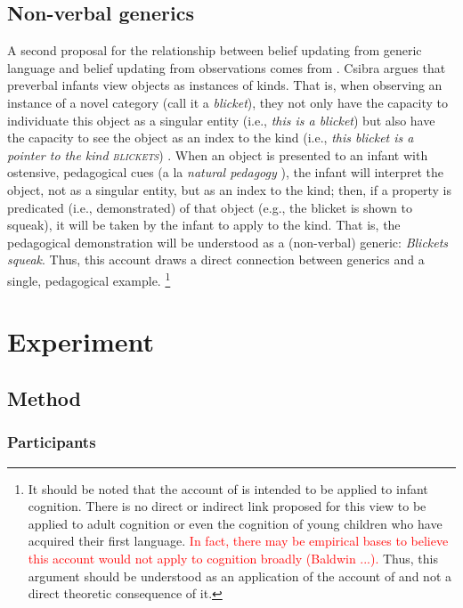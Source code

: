 \documentclass[10pt,letterpaper]{article}
\newcommand{\red}[1]{\textcolor{Red}{#1}}
\begin{document}
\subsection{Non-verbal generics}

A second proposal for the relationship between belief updating from generic language and belief updating from observations comes from . Csibra argues that preverbal infants view objects as instances of kinds. That is, when observing an instance of a novel category (call it a \emph{blicket}), they not only have the capacity to individuate this object as a singular entity (i.e., \emph{this is a blicket}) but also have the capacity to see the object as an index to the kind (i.e., \emph{this blicket is a pointer to the kind \textsc{blickets}}) .  When an object is presented to an infant with ostensive, pedagogical cues (a la \emph{natural pedagogy} \cite{CsibraGereley}), the infant will interpret the object, not as a singular entity, but as an index to the kind; then, if a property is predicated (i.e., demonstrated) of that object (e.g., the blicket is shown to squeak), it will be taken by the infant to apply to the kind. That is, the pedagogical demonstration will be understood as a (non-verbal) generic: \emph{Blickets squeak}. Thus, this account draws a direct connection between generics and a single, pedagogical example. \footnote{It should be noted that the account of  is intended to be applied to infant cognition. There is no direct or indirect link proposed for this view to be applied to adult cognition or even the cognition of young children who have acquired their first language. \red{In fact, there may be empirical bases to believe this account would not apply to cognition broadly (Baldwin ...).} Thus, this argument should be understood as an application of the account of  and not a direct theoretic consequence of it.} 

\section{Experiment}

\subsection{Method}

\subsubsection{Participants}
\end{document}
